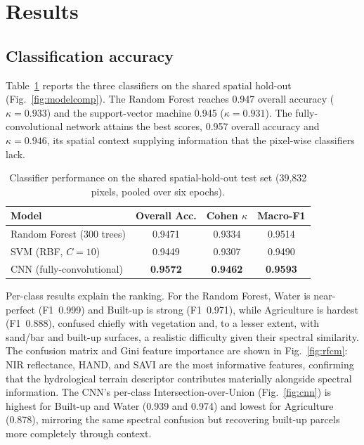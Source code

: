 \documentclass[journal]{IEEEtran}
\begin{document}
\section{Results}\label{sec:results}

\subsection{Classification accuracy}
Table~\ref{tab:models} reports the three classifiers on the shared spatial hold-out (Fig.~\ref{fig:modelcomp}). The Random Forest reaches 0.947 overall accuracy ($\kappa=0.933$) and the support-vector machine 0.945 ($\kappa=0.931$). The fully-convolutional network attains the best scores, 0.957 overall accuracy and $\kappa=0.946$, its spatial context supplying information that the pixel-wise classifiers lack.

\begin{table}[!t]
\caption{Classifier performance on the shared spatial-hold-out test set (39{,}832 pixels, pooled over six epochs).}
\label{tab:models}
\centering
\begin{tabular}{lccc}
\toprule
Model & Overall Acc. & Cohen $\kappa$ & Macro-F1 \\
\midrule
Random Forest (300 trees) & 0.9471 & 0.9334 & 0.9514 \\
SVM (RBF, $C{=}10$) & 0.9449 & 0.9307 & 0.9490 \\
CNN (fully-convolutional) & \textbf{0.9572} & \textbf{0.9462} & \textbf{0.9593} \\
\bottomrule
\end{tabular}
\end{table}

Per-class results explain the ranking. For the Random Forest, Water is near-perfect (F1~0.999) and Built-up is strong (F1~0.971), while Agriculture is hardest (F1~0.888), confused chiefly with vegetation and, to a lesser extent, with sand/bar and built-up surfaces, a realistic difficulty given their spectral similarity. The confusion matrix and Gini feature importance are shown in Fig.~\ref{fig:rfcm}: NIR reflectance, HAND, and SAVI are the most informative features, confirming that the hydrological terrain descriptor contributes materially alongside spectral information. The CNN's per-class Intersection-over-Union (Fig.~\ref{fig:cnn}) is highest for Built-up and Water (0.939 and 0.974) and lowest for Agriculture (0.878), mirroring the same spectral confusion but recovering built-up parcels more completely through context.
\end{document}
